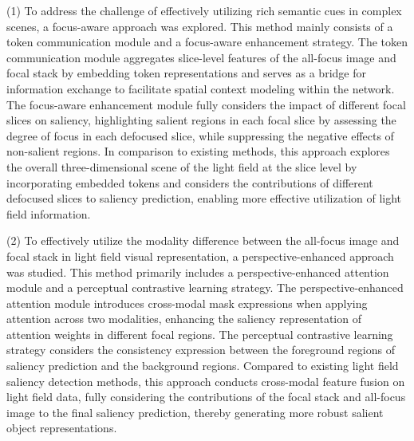 \begin{englishabstract}
(1)
To address the challenge of effectively utilizing rich semantic cues in complex scenes, a focus-aware approach was explored. This method mainly consists of a token communication module and a focus-aware enhancement strategy. The token communication module aggregates slice-level features of the all-focus image and focal stack by embedding token representations and serves as a bridge for information exchange to facilitate spatial context modeling within the network. The focus-aware enhancement module fully considers the impact of different focal slices on saliency, highlighting salient regions in each focal slice by assessing the degree of focus in each defocused slice, while suppressing the negative effects of non-salient regions. In comparison to existing methods, this approach explores the overall three-dimensional scene of the light field at the slice level by incorporating embedded tokens and considers the contributions of different defocused slices to saliency prediction, enabling more effective utilization of light field information.





(2)
To effectively utilize the modality difference between the all-focus image and focal stack in light field visual representation, a perspective-enhanced approach was studied. This method primarily includes a perspective-enhanced attention module and a perceptual contrastive learning strategy. The perspective-enhanced attention module introduces cross-modal mask expressions when applying attention across two modalities, enhancing the saliency representation of attention weights in different focal regions. The perceptual contrastive learning strategy considers the consistency expression between the foreground regions of saliency prediction and the background regions. Compared to existing light field saliency detection methods, this approach conducts cross-modal feature fusion on light field data, fully considering the contributions of the focal stack and all-focus image to the final saliency prediction, thereby generating more robust salient object representations.

	
	
\end{englishabstract}







